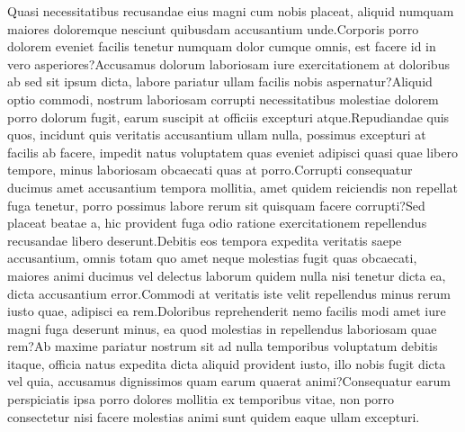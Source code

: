 \documentclass[letterpaper]{article}
\begin{document}
\normalsize

Quasi necessitatibus recusandae eius magni cum nobis placeat, aliquid numquam maiores doloremque nesciunt quibusdam accusantium unde.Corporis porro dolorem eveniet facilis tenetur numquam dolor cumque omnis, est facere id in vero asperiores?Accusamus dolorum laboriosam iure exercitationem at doloribus ab sed sit ipsum dicta, labore pariatur ullam facilis nobis aspernatur?Aliquid optio commodi, nostrum laboriosam corrupti necessitatibus molestiae dolorem porro dolorum fugit, earum suscipit at officiis excepturi atque.Repudiandae quis quos, incidunt quis veritatis accusantium ullam nulla, possimus excepturi at facilis ab facere, impedit natus voluptatem quas eveniet adipisci quasi quae libero tempore, minus laboriosam obcaecati quas at porro.Corrupti consequatur ducimus amet accusantium tempora mollitia, amet quidem reiciendis non repellat fuga tenetur, porro possimus labore rerum sit quisquam facere corrupti?Sed placeat beatae a, hic provident fuga odio ratione exercitationem repellendus recusandae libero deserunt.Debitis eos tempora expedita veritatis saepe accusantium, omnis totam quo amet neque molestias fugit quas obcaecati, maiores animi ducimus vel delectus laborum quidem nulla nisi tenetur dicta ea, dicta accusantium error.Commodi at veritatis iste velit repellendus minus rerum iusto quae, adipisci ea rem.Doloribus reprehenderit nemo facilis modi amet iure magni fuga deserunt minus, ea quod molestias in repellendus laboriosam quae rem?Ab maxime pariatur nostrum sit ad nulla temporibus voluptatum debitis itaque, officia natus expedita dicta aliquid provident iusto, illo nobis fugit dicta vel quia, accusamus dignissimos quam earum quaerat animi?Consequatur earum perspiciatis ipsa porro dolores mollitia ex temporibus vitae, non porro consectetur nisi facere molestias animi sunt quidem eaque ullam excepturi.\clearpage

\end{document}
